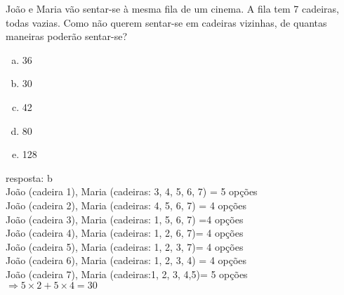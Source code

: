 \begin{ex}
 João e Maria vão sentar-se à mesma fila de um cinema. A fila tem 7 cadeiras, todas vazias. Como não querem sentar-se em cadeiras vizinhas, de quantas maneiras poderão sentar-se?
    \begin{enumerate}[(a)]
    \item 36
    \item 30
    \item 42
    \item 80
    \item 128
    \end{enumerate}
    \begin{sol}
      resposta: b \\
      João (cadeira 1), Maria (cadeiras: 3, 4, 5, 6, 7) = 5 opções \\
      João (cadeira 2), Maria (cadeiras: 4, 5, 6, 7) = 4 opções  \\
      João (cadeira 3), Maria (cadeiras: 1, 5, 6, 7) =4 opções  \\
      João (cadeira 4), Maria (cadeiras: 1, 2, 6, 7)= 4 opções \\
      João (cadeira 5), Maria (cadeiras: 1, 2, 3, 7)= 4 opções  \\
      João (cadeira 6), Maria (cadeiras: 1, 2, 3, 4) = 4 opções \\
      João (cadeira 7), Maria (cadeiras:1, 2, 3, 4,5)= 5 opções \\
      $\Longrightarrow5\times2+5\times4=30$
      
      
    \end{sol}
\end{ex}